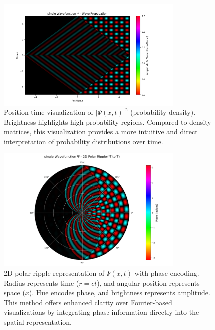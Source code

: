 \documentclass[12pt]{article}
\begin{document}
\begin{figure}[H]
    \centering
    \includegraphics[width=0.8\textwidth]{images/single_wavefunction_probability_density_with_phase.png}
    \caption{Position-time visualization of \(|\Psi(x,t)|^2\) (probability density). Brightness highlights high-probability regions. Compared to density matrices, this visualization provides a more intuitive and direct interpretation of probability distributions over time.}
    \label{fig:single_xt_density}
\end{figure}

\begin{figure}[H]
    \centering
    \includegraphics[width=0.8\textwidth]{images/single_wavefunction_2d_polar_with_phase.png}
    \caption{2D polar ripple representation of \(\Psi(x,t)\) with phase encoding. Radius represents time (\(r = ct\)), and angular position represents space (\(x\)). Hue encodes phase, and brightness represents amplitude. This method offers enhanced clarity over Fourier-based visualizations by integrating phase information directly into the spatial representation.}
    \label{fig:single_2d_polar}
\end{figure}
\end{document}
